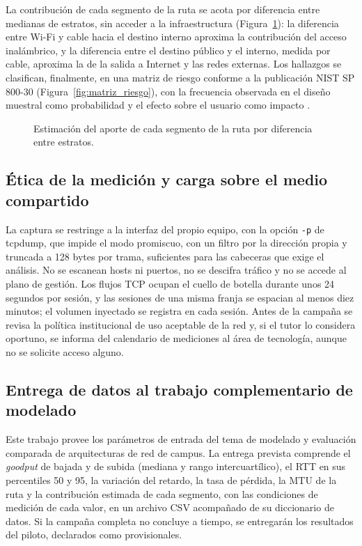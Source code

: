 La contribución de cada segmento de la ruta se acota por diferencia entre medianas de estratos, sin acceder a la infraestructura (Figura~\ref{fig:aporte_segmentos}): la diferencia entre Wi-Fi y cable hacia el destino interno aproxima la contribución del acceso inalámbrico, y la diferencia entre el destino público y el interno, medida por cable, aproxima la de la salida a Internet y las redes externas. Los hallazgos se clasifican, finalmente, en una matriz de riesgo conforme a la publicación NIST SP 800-30 (Figura~\ref{fig:matriz_riesgo}), con la frecuencia observada en el diseño muestral como probabilidad y el efecto sobre el usuario como impacto \cite{nist80030}.

\begin{figure}[htbp]
  \centering
  \resizebox{\textwidth}{!}{}
  \caption{Estimación del aporte de cada segmento de la ruta por diferencia entre estratos.}
  \label{fig:aporte_segmentos}
  \raggedright
\end{figure}

\subsection{Ética de la medición y carga sobre el medio compartido}

La captura se restringe a la interfaz del propio equipo, con la opción \texttt{-p} de tcpdump, que impide el modo promiscuo, con un filtro por la dirección propia y truncada a 128 bytes por trama, suficientes para las cabeceras que exige el análisis. No se escanean hosts ni puertos, no se descifra tráfico y no se accede al plano de gestión. Los flujos TCP ocupan el cuello de botella durante unos 24 segundos por sesión, y las sesiones de una misma franja se espacian al menos diez minutos; el volumen inyectado se registra en cada sesión. Antes de la campaña se revisa la política institucional de uso aceptable de la red y, si el tutor lo considera oportuno, se informa del calendario de mediciones al área de tecnología, aunque no se solicite acceso alguno.

\subsection{Entrega de datos al trabajo complementario de modelado}

Este trabajo provee los parámetros de entrada del tema de modelado y evaluación comparada de arquitecturas de red de campus. La entrega prevista comprende el \textit{goodput} de bajada y de subida (mediana y rango intercuartílico), el RTT en sus percentiles 50 y 95, la variación del retardo, la tasa de pérdida, la MTU de la ruta y la contribución estimada de cada segmento, con las condiciones de medición de cada valor, en un archivo CSV acompañado de su diccionario de datos. Si la campaña completa no concluye a tiempo, se entregarán los resultados del piloto, declarados como provisionales. 

